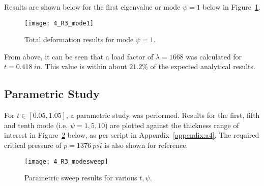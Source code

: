 Results are shown below for the first eigenvalue or mode $\psi = 1$ below in Figure~\ref{fig:4_R3_mode1}.
\begin{figure}[H]
	\centering
	\texttt{[image: 4\_R3\_mode1]}
	\caption{Total deformation results for mode $\psi = 1$.}
	\label{fig:4_R3_mode1}
\end{figure}

From above, it can be seen that a load factor of $\lambda = 1668$ was calculated for $t= 0.418\ in$. This value is within about $21.2\%$ of the expected analytical results.

\subsection{Parametric Study}

For $t\in [0.05, 1.05]$, a parametric study was performed. Results for the first, fifth and tenth mode (i.e. $\psi = 1, 5, 10$) are plotted against the thickness range of interest in Figure~\ref{fig:4_R3_modesweep} below, as per \cite{PYTHON} script in Appendix~\ref{appendix:a4}. The required critical pressure of $p =1376\ psi$ is also shown for reference.

\begin{figure}[H]
	\centering
	\texttt{[image: 4\_R3\_modesweep]}
	\caption{Parametric sweep results for various $t, \psi$.}
	\label{fig:4_R3_modesweep}
\end{figure}





